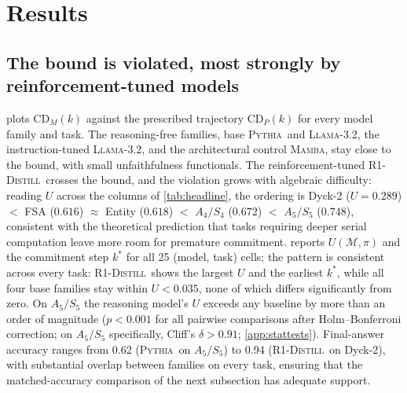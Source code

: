 \documentclass[11pt]{article}
\newcommand{\CDP}{\mathrm{CD}_{P}}
\newcommand{\CDM}{\mathrm{CD}_{M}}
\newcommand{\stepk}{k}
\newcommand{\Pythia}{\textsc{Pythia}}
\newcommand{\Llama}{\textsc{Llama-3.2}}
\newcommand{\Mamba}{\textsc{Mamba}}
\newcommand{\Rdistill}{\textsc{R1-Distill}}
\begin{document}
\section{Results}
\label{sec:results}

\subsection{The bound is violated, most strongly by reinforcement-tuned models}
\label{sec:results-main}

 plots $\CDM(\stepk)$ against the prescribed trajectory
$\CDP(\stepk)$ for every model family and task. The reasoning-free families,
base \Pythia\ and \Llama, the instruction-tuned \Llama, and the architectural
control \Mamba, stay close to the bound, with small unfaithfulness functionals.
The reinforcement-tuned \Rdistill\ crosses the bound, and the
violation grows with algebraic difficulty: reading $U$ across the columns of
\cref{tab:headline}, the ordering is Dyck-2 ($U\!=\!0.289$) $<$ FSA ($0.616$)
$\approx$ Entity ($0.618$) $<$ $A_4/S_4$ ($0.672$) $<$ $A_5/S_5$ ($0.748$),
consistent with the theoretical prediction that tasks requiring deeper serial
computation leave more room for premature commitment.
 reports $U(\mathcal{M},\pi)$ and the commitment step
$\stepk^{*}$ for all 25 (model, task) cells; the pattern is consistent across
every task: \Rdistill\ shows the largest $U$ and the earliest $\stepk^{*}$,
while all four base families stay within $U < 0.035$, none of which differs
significantly from zero. On $A_5/S_5$ the reasoning model's $U$ exceeds any
baseline by more than an order of magnitude ($p < 0.001$ for all pairwise
comparisons after Holm--Bonferroni correction; on $A_5/S_5$ specifically,
Cliff's $\delta > 0.91$; \cref{app:stattests}). Final-answer accuracy ranges from 0.62 (\Pythia\ on
$A_5/S_5$) to 0.94 (\Rdistill\ on Dyck-2), with substantial overlap between
families on every task, ensuring that the matched-accuracy comparison of the
next subsection has adequate support.
\end{document}
